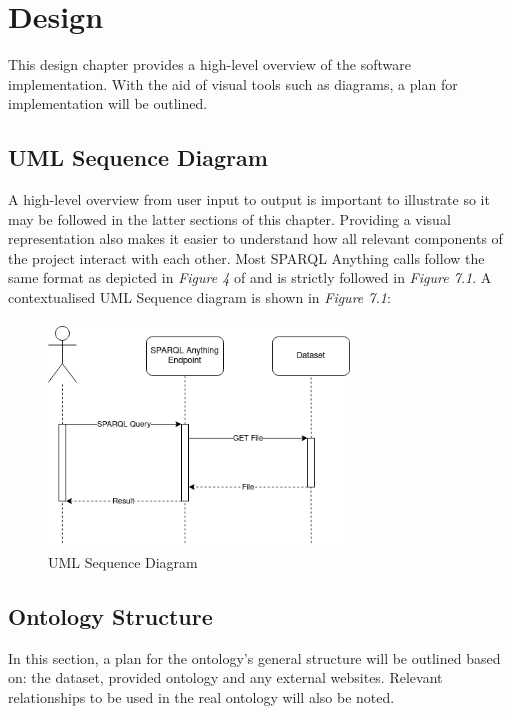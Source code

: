 \chapter{Design}
This design chapter provides a high-level overview of the software implementation. With the aid of visual tools such as diagrams, a plan for implementation will be outlined. 

\section{UML Sequence Diagram}
\hspace{0.5cm} A high-level overview from user input to output is important to illustrate so it may be followed in the latter sections of this chapter. Providing a visual representation also makes it easier to understand how all relevant components of the project interact with each other. Most SPARQL Anything calls follow the same format as depicted in \textit{Figure 4} of \cite{asprino2023knowledge} and is strictly followed in \textit{Figure 7.1}. A contextualised UML Sequence diagram is shown in \textit{Figure 7.1}: 

\begin{figure}[H]
\begin{center}
    \includegraphics[width=8cm, height=6cm]{Images/UMLSequenceDiagram.drawio.png}
\end{center}
\vspace{-0.5cm}
\caption{UML Sequence Diagram}
\end{figure}
\vspace{-0.7cm}

\section{Ontology Structure}
\hspace{0.5cm} In this section, a plan for the ontology's general structure will be outlined based on: the dataset, provided ontology and any external websites. Relevant relationships to be used in the real ontology will also be noted. 

